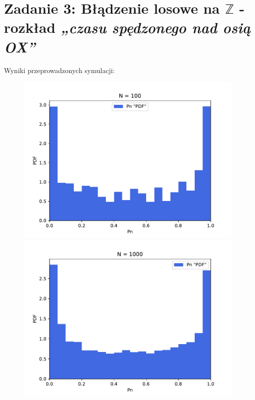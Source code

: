 \documentclass{article}
\begin{document}
\section*{Zadanie 3: Błądzenie losowe na \(\mathbb{Z}\) - rozkład \textit{„czasu spędzonego nad osią OX”}}

Wyniki przeprowadzonych symulacji:\\
\begin{figure}[h!]
    \centering
    \begin{minipage}{0.45\textwidth}
        \centering
        \includegraphics[scale=0.5]{./plots/exc3/n100.pdf}
    \end{minipage}%
    \begin{minipage}{0.45\textwidth}
        \centering
        \includegraphics[scale=0.5]{./plots/exc3/n1000.pdf}

\end{minipage}
\end{figure}
\end{document}
